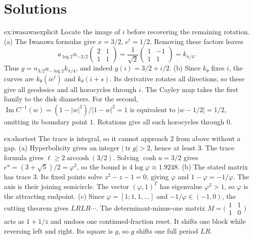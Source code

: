 \section{Solutions}

\begin{solution}{ex:iwasawaexplicit}
\idea Locate the image of $i$ before recovering the remaining rotation.
\writeup (a) The Iwasawa formulas give $x=3/2$, $e^t=1/2$. Removing these factors leaves
\[
a_{\log2}n_{-3/2}\begin{pmatrix}2&1\\1&1\end{pmatrix}
=\frac1{\sqrt2}\begin{pmatrix}1&-1\\1&1\end{pmatrix}=k_{\pi/4}.
\]
Thus $g=n_{3/2}a_{-\log2}k_{\pi/4}$, and indeed $g(i)=3/2+i/2$.
(b) Since $k_\theta$ fixes $i$, the curves are $k_\theta(ie^t)$ and $k_\theta(i+s)$. Its derivative rotates all directions, so these give all geodesics and all horocycles through $i$. The Cayley map takes the first family to the disk diameters. For the second, $\operatorname{Im}C^{-1}(w)=(1-|w|^2)/|1-w|^2=1$ is equivalent to $|w-1/2|=1/2$, omitting its boundary point $1$. Rotations give all such horocycles through $0$.
\end{solution}

\begin{solution}{ex:shortest}
\idea The trace is integral, so it cannot approach $2$ from above without a gap.
\writeup (a) Hyperbolicity gives an integer $|\operatorname{tr}g|>2$, hence at least $3$. The trace formula gives $\ell\ge2\operatorname{arccosh}(3/2)$. Solving $\cosh u=3/2$ gives $e^u=(3+\sqrt5)/2=\varphi^2$, so the bound is $4\log\varphi\approx1.9248$.
(b) The stated matrix has trace $3$. Its fixed points solve $z^2-z-1=0$, giving $\varphi$ and $1-\varphi=-1/\varphi$. The axis is their joining semicircle. The vector $(\varphi,1)^T$ has eigenvalue $\varphi^2>1$, so $\varphi$ is the attracting endpoint.
(c) Since $\varphi=[1;1,1,\ldots]$ and $-1/\varphi\in(-1,0)$, the cutting theorem gives $LRLR\cdots$. The determinant-minus-one matrix $M=\bigl(\begin{smallmatrix}1&1\\1&0\end{smallmatrix}\bigr)$ acts as $1+1/\bar z$ and undoes one continued-fraction reset. It shifts one block while reversing left and right. Its square is $g$, so $g$ shifts one full period $LR$.
\end{solution}

